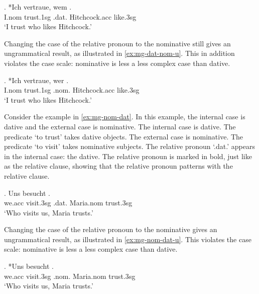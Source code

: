 \exg. *Ich vertraue, wem  .\\
I.\ac{nom} trust.1\ac{sg}\scsub{[dat]} .\ac{dat}. Hitchcock.\ac{acc} like.3\ac{sg}\scsub{[nom]}\\
`I trust who likes Hitchcock.' \label{ex:mg-dat-nom}

Changing the case of the relative pronoun to the nominative still gives an ungrammatical result, as illustrated in \ref{ex:mg-dat-nom-u}. This in addition violates the case scale: nominative is less a less complex case than dative.

\exg. *Ich vertraue, wer  .\\
I.\ac{nom} trust.1\ac{sg}\scsub{[dat]} .\ac{nom}. Hitchcock.\ac{acc} like.3\ac{sg}\scsub{[nom]}\\
`I trust who likes Hitchcock.' \label{ex:mg-dat-nom-u}

Consider the example in \ref{ex:mg-nom-dat}. In this example, the internal case is dative and the external case is nominative.
The internal case is dative. The predicate  `to trust' takes dative objects.
The external case is nominative. The predicate  `to visit' takes nominative subjects.
The relative pronoun  `.\ac{dat}.' appears in the internal case: the dative. The relative pronoun is marked in bold, just like as the relative clause, showing that the relative pronoun patterns with the relative clause.

\exg. Uns besucht   .\\
we.\ac{acc} visit.3\ac{sg}\scsub{[nom]} .\ac{dat}. Maria.\ac{nom} trust.3\ac{sg}\scsub{[dat]}\\
`Who visits us, Maria trusts.' \label{ex:mg-nom-dat}

Changing the case of the relative pronoun to the nominative gives an ungrammatical result, as illustrated in \ref{ex:mg-nom-dat-u}. This violates the case scale: nominative is less a less complex case than dative.

\exg. *Uns besucht   .\\
we.\ac{acc} visit.3\ac{sg}\scsub{[nom]} .\ac{nom}. Maria.\ac{nom} trust.3\ac{sg}\scsub{[dat]}\\
`Who visits us, Maria trusts.' \label{ex:mg-nom-dat-u}

